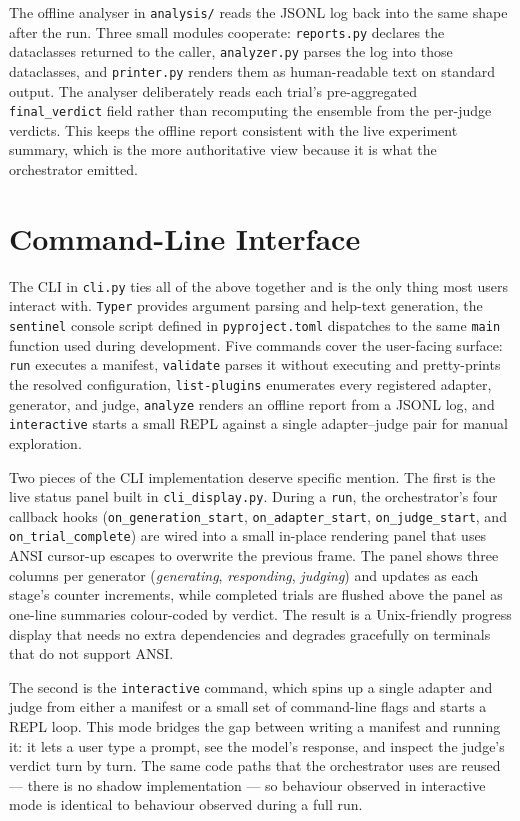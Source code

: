 The offline analyser in \texttt{analysis/} reads the JSONL log back into the same shape after the run.
Three small modules cooperate: \texttt{reports.py} declares the dataclasses returned to the caller, \texttt{analyzer.py} parses the log into those dataclasses, and \texttt{printer.py} renders them as human-readable text on standard output.
The analyser deliberately reads each trial's pre-aggregated \texttt{final\_verdict} field rather than recomputing the ensemble from the per-judge verdicts.
This keeps the offline report consistent with the live experiment summary, which is the more authoritative view because it is what the orchestrator emitted.

\section{Command-Line Interface}\label{sec:impl-cli}

The CLI in \texttt{cli.py} ties all of the above together and is the only thing most users interact with.
\texttt{Typer} provides argument parsing and help-text generation, the \texttt{sentinel} console script defined in \texttt{pyproject.toml} dispatches to the same \texttt{main} function used during development.
Five commands cover the user-facing surface: \texttt{run} executes a manifest, \texttt{validate} parses it without executing and pretty-prints the resolved configuration, \texttt{list-plugins} enumerates every registered adapter, generator, and judge, \texttt{analyze} renders an offline report from a JSONL log, and \texttt{interactive} starts a small REPL against a single adapter--judge pair for manual exploration.

Two pieces of the CLI implementation deserve specific mention.
The first is the live status panel built in \texttt{cli\_display.py}.
During a \texttt{run}, the orchestrator's four callback hooks (\texttt{on\_generation\_start}, \texttt{on\_adapter\_start}, \texttt{on\_judge\_start}, and \texttt{on\_trial\_complete}) are wired into a small in-place rendering panel that uses ANSI cursor-up escapes to overwrite the previous frame.
The panel shows three columns per generator (\emph{generating}, \emph{responding}, \emph{judging}) and updates as each stage's counter increments, while completed trials are flushed above the panel as one-line summaries colour-coded by verdict.
The result is a Unix-friendly progress display that needs no extra dependencies and degrades gracefully on terminals that do not support ANSI.

The second is the \texttt{interactive} command, which spins up a single adapter and judge from either a manifest or a small set of command-line flags and starts a REPL loop.
This mode bridges the gap between writing a manifest and running it: it lets a user type a prompt, see the model's response, and inspect the judge's verdict turn by turn.
The same code paths that the orchestrator uses are reused --- there is no shadow implementation --- so behaviour observed in interactive mode is identical to behaviour observed during a full run.

